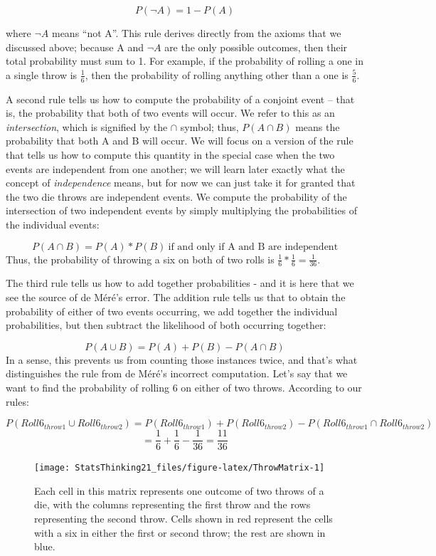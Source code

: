 \documentclass[
  12pt,
]{book}
\begin{document}
\[
P(\neg A) = 1 - P(A)
\]

where \(\neg A\) means ``not A''. This rule derives directly from the axioms that we discussed above; because A and \(\neg A\) are the only possible outcomes, then their total probability must sum to 1. For example, if the probability of rolling a one in a single throw is \(\frac{1}{6}\), then the probability of rolling anything other than a one is \(\frac{5}{6}\).

A second rule tells us how to compute the probability of a conjoint event -- that is, the probability that both of two events will occur. We refer to this as an \emph{intersection}, which is signified by the \(\cap\) symbol; thus, \(P(A \cap B)\) means the probability that both A and B will occur. We will focus on a version of the rule that tells us how to compute this quantity in the special case when the two events are independent from one another; we will learn later exactly what the concept of \emph{independence} means, but for now we can just take it for granted that the two die throws are independent events. We compute the probability of the intersection of two independent events by simply multiplying the probabilities of the individual events:

\[
P(A \cap B) = P(A) * P(B)\ \text{if and only if A and B are independent}
\]
Thus, the probability of throwing a six on both of two rolls is \(\frac{1}{6}*\frac{1}{6}=\frac{1}{36}\).

The third rule tells us how to add together probabilities - and it is here that we see the source of de Méré's error. The addition rule tells us that to obtain the probability of either of two events occurring, we add together the individual probabilities, but then subtract the likelihood of both occurring together:

\[
P(A \cup B) = P(A) + P(B) - P(A \cap B)
\]
In a sense, this prevents us from counting those instances twice, and that's what distinguishes the rule from de Méré's incorrect computation. Let's say that we want to find the probability of rolling 6 on either of two throws. According to our rules:

\[
P(Roll6_{throw1} \cup Roll6_{throw2}) = P(Roll6_{throw1}) + P(Roll6_{throw2}) - P(Roll6_{throw1} \cap Roll6_{throw2}) 
\]
\[
= \frac{1}{6} + \frac{1}{6} - \frac{1}{36} = \frac{11}{36}
\]

\begin{figure}
\texttt{[image: StatsThinking21\_files/figure-latex/ThrowMatrix-1]} \caption{Each cell in this matrix represents one outcome of two throws of a die, with the columns representing the first throw and the rows representing the second throw. Cells shown in red represent the cells with a six in either the first or second throw; the rest are shown in blue.}\label{fig:ThrowMatrix}
\end{figure}
\end{document}
